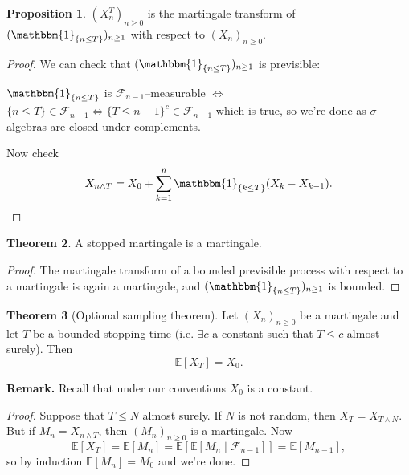 \documentclass{article}
\theoremstyle{definition}
\newtheorem{theorem}{Theorem}[section]
\newtheorem{prop}[theorem]{Proposition}
\begin{document}
\begin{prop}
    $(X_n^T)_{n\ge 0}$ is the martingale transform of $(\mathbbm{1}_{\{n\le T\}})_{n\ge 1}$ with respect to $(X_n)_{n\ge 0}$.
    \begin{proof}
        We can check that $(\mathbbm{1}_{\{n\le T\}})_{n\ge 1}$ is previsible:
    \vspace{1mm}

    $\mathbbm{1}_{\{n \le T\}}$ is $\mathcal{F}_{n-1}$--measurable $\iff$ $\{n\le T\}\in \mathcal{F}_{n-1} \iff \{T\le n-1\}^{c} \in \mathcal{F}_{n-1}$ which is true, so we're done as $\sigma$--algebras are closed under complements. 
    \vspace{1mm}
    
    Now check
    \[
    X_{n \wedge T} = X_0 + \sum_{k=1}^{n} \mathbbm{1}_{\{k\le T\}}(X_k-X_{k-1}).
    \]
    \end{proof}
    
\end{prop}
\begin{theorem}
    A stopped martingale is a martingale.
\end{theorem}
\begin{proof}
    The martingale transform of a bounded previsible process with respect to a martingale is again a martingale, and $(\mathbbm{1}_{\{n\le T\}})_{n\ge 1}$ is bounded.
\end{proof}
\begin{theorem}[Optional sampling theorem]
    Let $(X_n)_{n\ge 0}$ be a martingale and let $T$ be a bounded stopping time (i.e. $\exists c$ a constant such that $T\le c$ almost surely). Then
    \[
    \mathbb{E}[X_T]=X_0.
    \]
\end{theorem}
\textbf{Remark.} Recall that under our conventions $X_0$ is a constant.
\begin{proof}
    Suppose that $T\le N$ almost surely. If $N$ is not random, then $X_T=X_{T \wedge N}$. But if $M_n=X_{n \wedge T}$, then $(M_n)_{n\ge 0}$ is a martingale. Now \[
    \mathbb{E}[X_T]=\mathbb{E}[M_n] = \mathbb{E}[\mathbb{E}[M_n \mid \mathcal{F}_{n-1}]]=\mathbb{E}[M_{n-1}],
    \]
    so by induction $\mathbb{E}[M_n]=M_0$ and we're done.
\end{proof}
\end{document}
